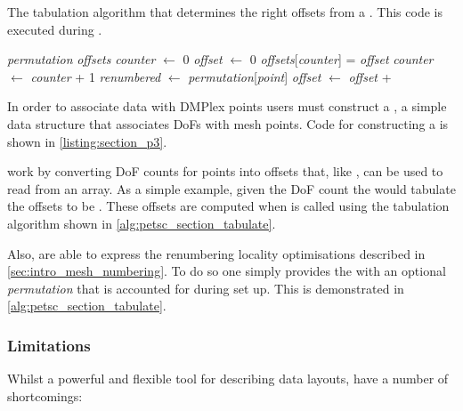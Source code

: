 \documentclass[thesis]{subfiles}
\begin{document}
\begin{algorithm}
  \caption{
    The tabulation algorithm that determines the right offsets from a .
    This code is executed during .
  }

  \begin{algorithmic}[1]
    \Require \textit{permutation} 
    \Require \textit{offsets} 
    \State \textit{counter} $\gets$ 0
    \State \textit{offset} $\gets$ 0
      \State \textit{offsets}[\textit{counter}] = \textit{offset} 
      \State \textit{counter} $\gets$ \textit{counter} + 1
      \State \textit{renumbered} $\gets$ \textit{permutation}[\textit{point}]
      \State \textit{offset} $\gets$ \textit{offset} + 
    \EndFor
  \end{algorithmic}

  \label{alg:petsc_section_tabulate}
\end{algorithm}

In order to associate data with DMPlex points users must construct a , a simple data structure that associates DoFs with mesh points.
Code for constructing a  is shown in \cref{listing:section_p3}.

 work by converting DoF counts for points into offsets that, like \numpy{}, can be used to read from an array.
As a simple example, given the DoF count \ccode{[1, 0, 3, 2, 0, 1]} the  would tabulate the offsets to be \ccode{[0, 1, 1, 4, 6, 6]}.
These offsets are computed when  is called using the tabulation algorithm shown in \cref{alg:petsc_section_tabulate}.

Also,  are able to express the renumbering locality optimisations described in \cref{sec:intro_mesh_numbering}.
To do so one simply provides the  with an optional \emph{permutation} that is accounted for during set up.
This is demonstrated in \cref{alg:petsc_section_tabulate}.

\subsubsection{Limitations}

Whilst a powerful and flexible tool for describing data layouts,  have a number of shortcomings:
\end{document}
